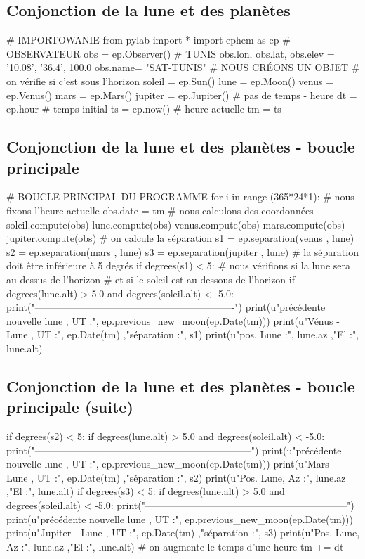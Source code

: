 \documentclass[%
oneside,                 %
final,                   %
10pt]{article}
\begin{document}
\vspace{6mm}



\subsection{Conjonction de la lune et des planètes}
\bpycod
# IMPORTOWANIE
from pylab import *
import ephem as ep
# OBSERVATEUR
obs = ep.Observer()
# TUNIS
obs.lon, obs.lat, obs.elev = '10.08', '36.4', 100.0
obs.name= "SAT-TUNIS"
# NOUS CRÉONS UN OBJET
# on vérifie si c'est sous l'horizon
soleil = ep.Sun()
lune = ep.Moon()
venus = ep.Venus()
mars = ep.Mars()
jupiter = ep.Jupiter()
# pas de temps - heure
dt = ep.hour
# temps initial
ts = ep.now()
# heure actuelle
tm = ts
\epycod

\subsection{Conjonction de la lune et des planètes - boucle principale}
\bpycod
# BOUCLE PRINCIPAL DU PROGRAMME
for i in range (365*24*1):
# nous fixons l'heure actuelle
    obs.date = tm
    # nous calculons des coordonnées
    soleil.compute(obs)
    lune.compute(obs)
    venus.compute(obs)
    mars.compute(obs)
    jupiter.compute(obs)
    # on calcule la séparation
    s1 = ep.separation(venus , lune)
    s2 = ep.separation(mars , lune)
    s3 = ep.separation(jupiter , lune)
    # la séparation doit être inférieure à 5 degrés
    if degrees(s1) < 5:
        # nous vérifions si la lune sera au-dessus de l'horizon
        # et si le soleil est au-dessous de l'horizon
        if degrees(lune.alt) > 5.0 and degrees(soleil.alt) < -5.0:
            print("-------------------------------------------------------------")
            print(u"précédente nouvelle lune , UT :", ep.previous_new_moon(ep.Date(tm)))
            print(u"Vénus - Lune , UT :", ep.Date(tm) ,"séparation :", s1)
            print(u"pos. Lune :", lune.az ,"El :", lune.alt)
\epycod

\subsection{Conjonction de la lune et des planètes - boucle principale (suite)}
\bpycod
if degrees(s2) < 5:
    if degrees(lune.alt) > 5.0 and degrees(soleil.alt) < -5.0:
        print("------------------------------------------------------------------")
        print(u"précédente nouvelle lune , UT :", ep.previous_new_moon(ep.Date(tm)))
        print(u"Mars - Lune , UT :", ep.Date(tm) ,"séparation :", s2)
        print(u"Pos. Lune, Az :", lune.az ,"El :", lune.alt)
if degrees(s3) < 5:
    if degrees(lune.alt) > 5.0 and degrees(soleil.alt) < -5.0:
        print("--------------------------------------------------------------")
        print(u"précédente nouvelle lune , UT :", ep.previous_new_moon(ep.Date(tm)))
        print(u"Jupiter - Lune , UT :", ep.Date(tm) ,"séparation :", s3)
        print(u"Pos. Lune, Az :", lune.az ,"El :", lune.alt)
    # on augmente le temps d'une heure
tm += dt
\epycod
\end{document}
